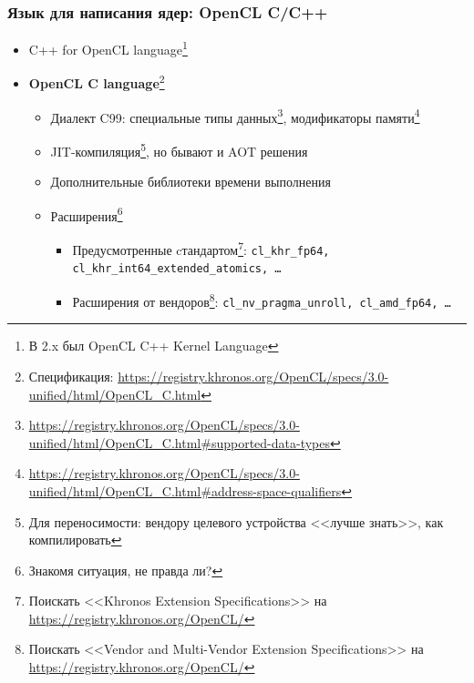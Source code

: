 \documentclass[xcolor=table,aspectratio=169]{beamer}
\begin{document}
\begin{frame}[fragile]
  \frametitle{Язык для написания ядер: OpenCL C/C++}
  \begin{itemize}
    \item C++ for OpenCL language\footnote{В 2.x был OpenCL C++ Kernel Language}
    \item \textbf{OpenCL C language}\footnote{Спецификация: \url{https://registry.khronos.org/OpenCL/specs/3.0-unified/html/OpenCL_C.html}}
    \begin{itemize}
      \item Диалект C99: специальные типы данных\footnote{\scriptsize{\url{https://registry.khronos.org/OpenCL/specs/3.0-unified/html/OpenCL_C.html\#supported-data-types}}}, модификаторы памяти\footnote{\scriptsize{\url{https://registry.khronos.org/OpenCL/specs/3.0-unified/html/OpenCL_C.html\#address-space-qualifiers}}}
      \item JIT-компиляция\footnote{Для переносимости: вендору целевого устройства <<лучше знать>>, как компилировать}, но бывают и AOT решения
      \item Дополнительные библиотеки времени выполнения
      \item Расширения\footnote{Знакомя ситуация, не правда ли?} 
      \begin{itemize}
        \item Предусмотренные cтандартом\footnote{Поискать <<Khronos Extension Specifications>> на \url{https://registry.khronos.org/OpenCL/}}: \texttt{cl\_khr\_fp64, cl\_khr\_int64\_extended\_atomics, \ldots} 
        \item Расширения от вендоров\footnote{Поискать <<Vendor and Multi-Vendor Extension Specifications>> на \scriptsize{\url{https://registry.khronos.org/OpenCL/}}}: \texttt{cl\_nv\_pragma\_unroll, cl\_amd\_fp64, \ldots} 
      \end{itemize}
    \end{itemize}
  \end{itemize}
\end{frame}
\end{document}
